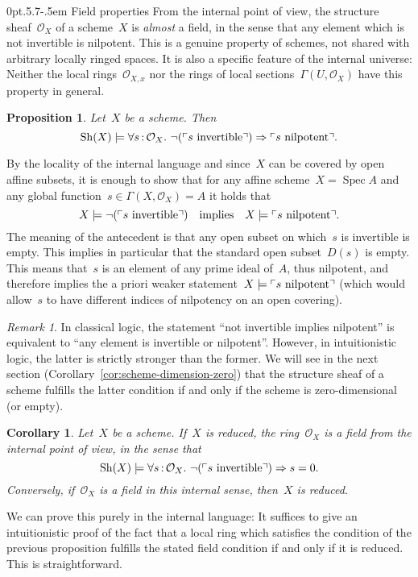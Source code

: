 \documentclass[10pt,reqno,a4paper]{amsbook}
\makeatletter
\theoremstyle{definition}
\theoremstyle{plain}
\newtheorem{prop}[defn]{Proposition}
\newtheorem{cor}[defn]{Corollary}
\theoremstyle{remark}
\newtheorem{rem}[defn]{Remark}
\renewcommand{\O}{\mathcal{O}}
\newcommand{\Sh}{\mathrm{Sh}}
\DeclareMathOperator{\Spec}{Spec}
\newcommand{\?}{\,{:}\,}
\renewcommand{\_}{\mathpunct{.}\,}
\newcommand{\speak}[1]{\ulcorner\text{\textnormal{#1}}\urcorner}
\renewenvironment{proof}[1][\proofname]{\par
  \pushQED{\qed}%
  \normalfont \topsep6\p@\@plus6\p@\relax
  \trivlist
  \item[\hskip\labelsep
        \itshape
    #1\@addpunct{.}]\ignorespaces
}{%
  \popQED\endtrivlist\@endpefalse
}
\def\subsection{\@startsection{subsection}{2}%
  {0pt}{.5\linespacing\@plus.7\linespacing}{-.5em}%
  {\normalfont\bfseries}}
\makeatother
\begin{document}
\subsection{Field properties} From the internal point of view, the structure
sheaf~$\O_X$ of a scheme~$X$ is \emph{almost} a field, in the sense that any
element which is not invertible is nilpotent. This is a genuine property of
schemes, not shared with arbitrary locally ringed spaces. It is also a specific
feature of the internal universe: Neither the local rings~$\O_{X,x}$ nor the
rings of local sections~$\Gamma(U,\O_X)$ have this property in general.

\begin{prop}\label{prop:neginvnilpotent}Let~$X$ be a scheme. Then
\[ \Sh(X) \models \forall s\?\O_X\_ \neg(\speak{$s$ invertible}) \Rightarrow
\speak{$s$ nilpotent}. \]
\end{prop}
\begin{proof}By the locality of the internal language and since~$X$ can be
covered by open affine subsets, it is enough to show that for any affine
scheme~$X = \Spec A$ and any global function~$s \in \Gamma(X,\O_X) = A$ it holds
that
\[ X \models \neg(\speak{$s$ invertible}) \quad\text{implies}\quad
  X \models \speak{$s$ nilpotent}. \]
The meaning of the antecedent is that any open subset on which~$s$ is
invertible is empty. This implies in particular that the standard open subset~$D(s)$ is
empty. This means that~$s$ is an element of any prime ideal of~$A$, thus
nilpotent, and therefore implies the a priori weaker statement~$X \models \speak{$s$
nilpotent}$ (which would allow~$s$ to have different indices of nilpotency on
an open covering).
\end{proof}

\begin{rem}In classical logic, the statement ``not invertible implies
nilpotent'' is equivalent to ``any element is invertible or nilpotent''.
However, in intuitionistic logic, the latter is strictly stronger than the
former. We will see in the next section
(Corollary~\ref{cor:scheme-dimension-zero}) that the structure sheaf of a
scheme fulfills the latter condition if and only if the scheme is
zero-dimensional (or empty).\end{rem}

\begin{cor}\label{cor:field-reduced}
Let~$X$ be a scheme. If~$X$ is reduced, the ring~$\O_X$ is a field
from the internal point of view, in the sense that
\[ \Sh(X) \models \forall s\?\O_X\_ \neg(\speak{$s$ invertible}) \Rightarrow
s=0. \]
Conversely, if~$\O_X$ is a field in this internal sense, then~$X$ is reduced.\end{cor}
\begin{proof}We can prove this purely in the internal language: It suffices to
give an intuitionistic proof of the fact that a local ring which satisfies the
condition of the previous proposition fulfills the stated field condition if
and only if it is reduced. This is straightforward.
\end{proof}
\end{document}
